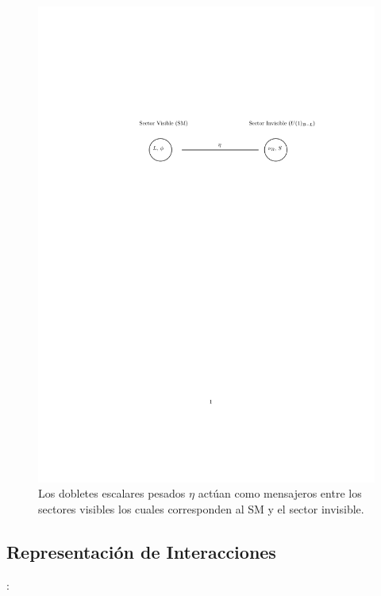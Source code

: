 \documentclass[12pt]{article}
\begin{document}
\begin{figure}[h!]
\begin{center} 
\includegraphics[scale=1.0]{sectors.pdf}
\caption{ Los dobletes escalares pesados $\eta$ actúan como mensajeros entre los sectores visibles los cuales corresponden al SM y el sector invisible.}
\label{fig:sectores}
\end{center}
\end{figure}


\subsection{Representación de Interacciones}:
\end{document}
